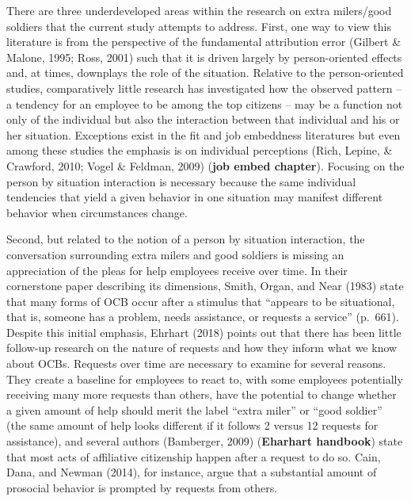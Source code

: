 \documentclass[english,,man]{apa6}
\begin{document}
There are three underdeveloped areas within the research on extra milers/good soldiers that the current study attempts to address. First, one way to view this literature is from the perspective of the fundamental attribution error (Gilbert \& Malone, 1995; Ross, 2001) such that it is driven largely by person-oriented effects and, at times, downplays the role of the situation. Relative to the person-oriented studies, comparatively little research has investigated how the observed pattern -- a tendency for an employee to be among the top citizens -- may be a function not only of the individual but also the interaction between that individual and his or her situation. Exceptions exist in the fit and job embeddness literatures but even among these studies the emphasis is on individual perceptions (Rich, Lepine, \& Crawford, 2010; Vogel \& Feldman, 2009) (\textbf{job embed chapter}). Focusing on the person by situation interaction is necessary because the same individual tendencies that yield a given behavior in one situation may manifest different behavior when circumstances change.

Second, but related to the notion of a person by situation interaction, the conversation surrounding extra milers and good soldiers is missing an appreciation of the pleas for help employees receive over time. In their cornerstone paper describing its dimensions, Smith, Organ, and Near (1983) state that many forms of OCB occur after a stimulus that \enquote{appears to be situational, that is, someone has a problem, needs assistance, or requests a service} (p.~661). Despite this initial emphasis, Ehrhart (2018) points out that there has been little follow-up research on the nature of requests and how they inform what we know about OCBs. Requests over time are necessary to examine for several reasons. They create a baseline for employees to react to, with some employees potentially receiving many more requests than others, have the potential to change whether a given amount of help should merit the label \enquote{extra miler} or \enquote{good soldier} (the same amount of help looks different if it follows 2 versus 12 requests for assistance), and several authors (Bamberger, 2009) (\textbf{Eharhart handbook}) state that most acts of affiliative citizenship happen after a request to do so. Cain, Dana, and Newman (2014), for instance, argue that a substantial amount of prosocial behavior is prompted by requests from others.
\end{document}
